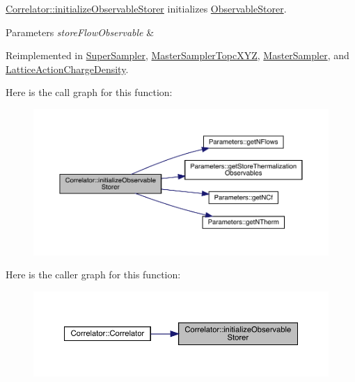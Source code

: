 \mbox{\hyperlink{class_correlator_ab99886c09dd27dfc8676d0032cecf9bc}{Correlator\+::initialize\+Observable\+Storer}} initializes \mbox{\hyperlink{class_observable_storer}{Observable\+Storer}}. 


\begin{DoxyParams}{Parameters}
{\em store\+Flow\+Observable} & \\
\hline
\end{DoxyParams}


Reimplemented in \mbox{\hyperlink{class_super_sampler_a4429d6ae37247a02259bc0c6d665821c}{Super\+Sampler}}, \mbox{\hyperlink{class_master_sampler_topc_x_y_z_af6d2cf2023d9626908fd26b07a7a0b84}{Master\+Sampler\+Topc\+X\+YZ}}, \mbox{\hyperlink{class_master_sampler_a88e2eec68ea6bd60cc3f375ac04a8ded}{Master\+Sampler}}, and \mbox{\hyperlink{class_lattice_action_charge_density_aba3131bbe5bd930adccc2852b4d44bb9}{Lattice\+Action\+Charge\+Density}}.

Here is the call graph for this function\+:\nopagebreak
\begin{figure}[H]
\begin{center}
\leavevmode
\includegraphics[width=350pt]{class_correlator_ab99886c09dd27dfc8676d0032cecf9bc_cgraph}
\end{center}
\end{figure}
Here is the caller graph for this function\+:\nopagebreak
\begin{figure}[H]
\begin{center}
\leavevmode
\includegraphics[width=350pt]{class_correlator_ab99886c09dd27dfc8676d0032cecf9bc_icgraph}
\end{center}
\end{figure}
\mbox{\label{class_correlator_ac7c5a07d7cbee97c417a1659b93083b2}} 
